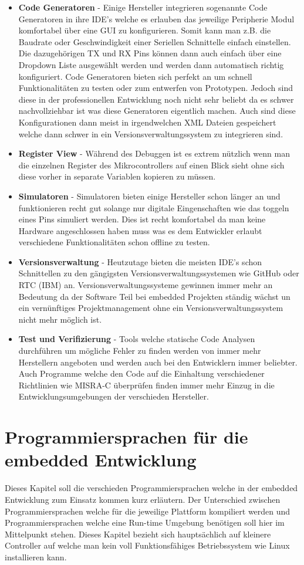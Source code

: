 \documentclass[MES,Master,ngerman]{twbook}%
\begin{document}
\begin{itemize}
	\item \textbf{Code Generatoren} - Einige Hersteller integrieren sogenannte Code Generatoren in ihre IDE's welche es erlauben das jeweilige Peripherie Modul komfortabel über eine GUI zu konfigurieren. Somit kann man z.B. die Baudrate oder Geschwindigkeit einer Seriellen Schnittelle einfach einstellen. Die dazugehörigen TX und RX Pins können dann auch einfach über eine Dropdown Liste ausgewählt werden und werden dann automatisch richtig konfiguriert. Code Generatoren bieten sich perfekt an um schnell Funktionalitäten zu testen oder zum entwerfen von Prototypen. Jedoch sind diese in der professionellen Entwicklung noch nicht sehr beliebt da es schwer nachvollziehbar ist was diese Generatoren eigentlich machen. Auch sind diese Konfigurationen dann meist in irgendwelchen XML Dateien gespeichert welche dann schwer in ein Versionsverwaltungssystem zu integrieren sind. 
	\item \textbf{Register View} - Während des Debuggen ist es extrem nützlich wenn man die einzelnen Register des Mikrocontrollers auf einen Blick sieht ohne sich diese vorher in separate Variablen kopieren zu müssen.
	\item \textbf{Simulatoren} - Simulatoren bieten einige Hersteller schon länger an und funktionieren recht gut solange nur digitale Eingenschaften wie das toggeln eines Pins simuliert werden. Dies ist recht komfortabel da man keine Hardware angeschlossen haben muss was es dem Entwickler erlaubt verschiedene Funktionalitäten schon offline zu testen.
	\item \textbf{Versionsverwaltung} - Heutzutage bieten die meisten IDE's schon Schnittellen zu den gängigsten Versionsverwaltungssystemen wie GitHub oder RTC (IBM) an. Versionsverwaltungssysteme gewinnen immer mehr an Bedeutung da der Software Teil bei embedded Projekten ständig wächst un ein vernünftiges Projektmanagement ohne ein Versionsverwaltungssystem  nicht mehr möglich ist.
	\item \textbf{Test und Verifizierung} - Tools welche statische Code Analysen durchführen um mögliche Fehler zu finden werden von immer mehr Herstellern angeboten und werden auch bei den Entwicklern immer beliebter. Auch Programme welche den Code auf die Einhaltung verschiedener Richtlinien wie MISRA-C überprüfen finden immer mehr Einzug in die Entwicklungsumgebungen der verschieden Hersteller.
\end{itemize}
\section{Programmiersprachen für die embedded Entwicklung}
Dieses Kapitel soll die verschieden Programmiersprachen welche in der embedded Entwicklung zum Einsatz kommen kurz erläutern. Der Unterschied zwischen Programmiersprachen welche für die jeweilige Plattform kompiliert werden und Programmiersprachen welche eine Run-time Umgebung benötigen soll hier im Mittelpunkt stehen. Dieses Kapitel bezieht sich hauptsächlich auf kleinere Controller auf welche man kein voll Funktionsfähiges Betriebssystem wie Linux installieren kann.
\end{document}
